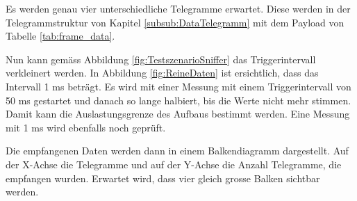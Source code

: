 Es werden genau vier unterschiedliche Telegramme erwartet. Diese werden in der Telegrammstruktur von Kapitel \ref{subsub:DataTelegramm} mit dem Payload von Tabelle \ref{tab:frame_data}.

Nun kann gemäss Abbildung \ref{fig:TestszenarioSniffer} das Triggerintervall verkleinert werden. In Abbildung \ref{fig:ReineDaten} ist ersichtlich, dass das Intervall 1 ms beträgt. Es wird mit einer Messung mit einem Triggerintervall von 50 ms gestartet und danach so lange halbiert, bis die Werte nicht mehr stimmen. Damit kann die Auslastungsgrenze des Aufbaus bestimmt werden. Eine Messung mit 1 ms wird ebenfalls noch geprüft.

Die empfangenen Daten werden dann in einem Balkendiagramm dargestellt. Auf der X-Achse die Telegramme und auf der Y-Achse die Anzahl Telegramme, die empfangen wurden. Erwartet wird, dass vier gleich grosse Balken sichtbar werden.

